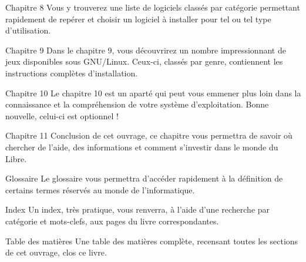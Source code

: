 \begin{DescriptionChapitres}
\item [Chapitre 8] Vous y trouverez une liste de logiciels classés par catégorie permettant rapidement de repérer et choisir un logiciel à installer pour tel ou tel type d'utilisation.
\item [Chapitre 9] Dans le chapitre 9, vous découvrirez un nombre impressionnant de jeux disponibles sous GNU/Linux. Ceux-ci, classés par genre, contiennent les instructions complètes d'installation.
\item [Chapitre 10] Le chapitre 10 est un aparté qui peut vous emmener plus loin dans la connaissance et la compréhension de votre système d'exploitation. Bonne nouvelle, celui-ci est optionnel !
\item [Chapitre 11] Conclusion de cet ouvrage, ce chapitre vous permettra de savoir où chercher de l'aide, des informations et comment s'investir dans le monde du Libre.
\item [Glossaire] Le glossaire vous permettra d'accéder rapidement à la définition de certains termes réservés au monde de l'informatique.
\item [Index] Un index, très pratique, vous renverra, à l'aide d'une recherche par catégorie et mots-clefs, aux pages du livre correspondantes.
\item [Table des matières] Une table des matières complète, recensant toutes les sections de cet ouvrage, clos ce livre.
\end{DescriptionChapitres}

